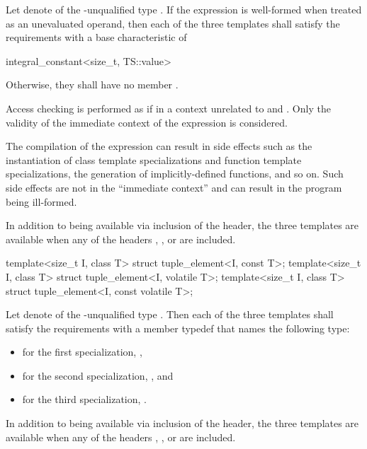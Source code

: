 \begin{itemdescr}
\pnum
Let  denote  of the \cv-unqualified type .
If the expression  is well-formed
when treated as an unevaluated operand, then each
of the three templates shall satisfy the  requirements
with a base characteristic of
\begin{codeblock}
integral_constant<size_t, TS::value>
\end{codeblock}
Otherwise, they shall have no member .

\pnum
Access checking is performed as if in a context
unrelated to  and .
Only the validity of the immediate context of the expression is considered.
\begin{note}
The compilation of the expression can result in side effects
such as the instantiation of class template specializations and
function template specializations, the generation of implicitly-defined functions, and so on.
Such side effects are not in the ``immediate context'' and
can result in the program being ill-formed.
\end{note}

\pnum
In addition to being available via inclusion of the  header,
the three templates are available
when any of the headers , , or 
are included.
\end{itemdescr}

%
\begin{itemdecl}
template<size_t I, class T> struct tuple_element<I, const T>;
template<size_t I, class T> struct tuple_element<I, volatile T>;
template<size_t I, class T> struct tuple_element<I, const volatile T>;
\end{itemdecl}

\begin{itemdescr}
\pnum
Let  denote  of the \cv-unqualified type . Then
each of the three templates shall satisfy the 
requirements with a member typedef  that names the following
type:

\begin{itemize}
\item
for the first specialization, ,
\item
for the second specialization, , and
\item
for the third specialization, .
\end{itemize}

\pnum
In addition to being available via inclusion of the  header,
the three templates are available
when any of the headers , , or 
are included.
\end{itemdescr}


